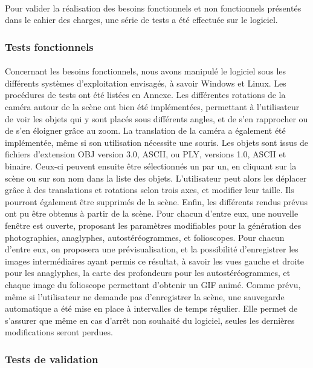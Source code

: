 \paragraph{}
Pour valider la réalisation des besoins fonctionnels et non fonctionnels présentés dans le cahier des charges, une série de tests a été effectuée sur le logiciel.

\subsubsection{Tests fonctionnels}
\paragraph{}
Concernant les besoins fonctionnels, nous avons manipulé le logiciel sous les différents systèmes d'exploitation envisagés, à savoir Windows et Linux. Les procédures de tests ont été listées en Annexe.
Les différentes rotations de la caméra autour de la scène ont bien été implémentées, permettant à l'utilisateur de voir les objets qui y sont placés sous différents angles, et de s'en rapprocher ou de s'en éloigner grâce au zoom. La translation de la caméra a également été implémentée, même si son utilisation nécessite une souris.
Les objets sont issus de fichiers d'extension OBJ version 3.0, ASCII, ou PLY, versions 1.0, ASCII et binaire. Ceux-ci peuvent ensuite être sélectionnés un par un, en cliquant sur la scène ou sur son nom dans la liste des objets. L'utilisateur peut alors les déplacer grâce à des translations et rotations selon trois axes, et modifier leur taille. Ils pourront également être supprimés de la scène.
Enfin, les différents rendus prévus ont pu être obtenus à partir de la scène. Pour chacun d'entre eux, une nouvelle fenêtre est ouverte, proposant les paramètres modifiables pour la génération des photographies, anaglyphes, autostéréogrammes, et folioscopes. Pour chacun d'entre eux, on proposera une prévisualisation, et la possibilité d'enregistrer les images intermédiaires ayant permis ce résultat, à savoir les vues gauche et droite pour les anaglyphes, la carte des profondeurs pour les autostéréogrammes, et chaque image du folioscope permettant d'obtenir un GIF animé.
Comme prévu, même si l'utilisateur ne demande pas d'enregistrer la scène, une sauvegarde automatique a été mise en place à intervalles de temps régulier. Elle permet de s'assurer que même en cas d'arrêt non souhaité du logiciel, seules les dernières modifications seront perdues.

\subsubsection{Tests de validation}
